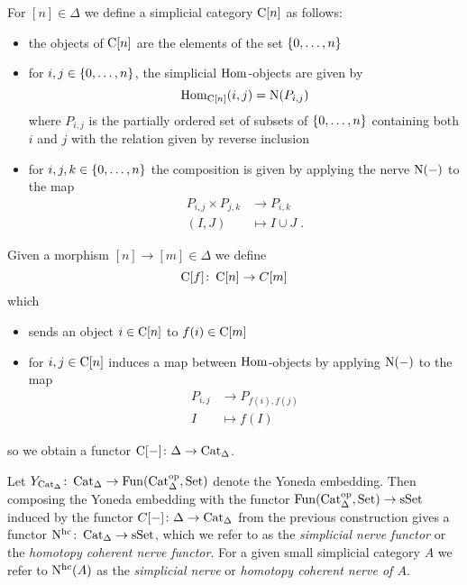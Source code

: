 \begin{construction}
    For $[n]\in\Delta$ we define a simplicial category $\operatorname{C}[n]$ as follows:
    \begin{itemize}
        \item the objects of $\operatorname{C}[n]$ are the elements of the set $\left\lbrace0,\ldots,n\right\rbrace$
        \item for $i,j\in\left\lbrace0,\ldots,n\right\rbrace$, the simplicial $\operatorname{Hom}$-objects are given by 
            \begin{equation*}
                \operatorname{Hom}_{\operatorname{C}[n]}(i,j)=\operatorname{N}(P_{i,j})
            \end{equation*}
            where $P_{i,j}$ is the partially ordered set of subsets of $\left\lbrace0,\ldots,n\right\rbrace$ containing both $i$ and $j$ with the relation given by reverse inclusion
        \item for $i,j,k\in\left\lbrace0,\ldots,n\right\rbrace$ the composition is given by applying the nerve $\operatorname{N}(-)$ to the map
        \begin{align*}
                P_{i,j}\times P_{j,k}&\to P_{i,k}\\
                (I,J)&\mapsto I\cup J\;.
        \end{align*}
    \end{itemize}
    Given a morphism $[n]\to[m]\in\Delta$ we define
    \begin{equation*}
        \operatorname{C}[f]\colon\operatorname{C}[n]\to C[m]
    \end{equation*}
    which
    \begin{itemize}
        \item sends an object $i\in\operatorname{C}[n]$ to $f(i)\in\operatorname{C}[m]$
        \item for $i,j\in\operatorname{C}[n]$ induces a map between $\operatorname{Hom}$-objects by applying $\operatorname{N}(-)$ to the map
            \begin{align*}
                P_{i,j}&\to P_{f(i),f(j)}\\
                I&\mapsto f(I)
            \end{align*}
    \end{itemize}
    so we obtain a functor $\operatorname{C}[-]\colon\Delta\to\operatorname{Cat}_{\Delta}$.
    \begin{reference}
        \cite[Notation 2.4.3.1]{kerodon}
    \end{reference}
\end{construction}
\begin{definition}
    Let $Y_{\operatorname{Cat}_{\Delta}}\colon\operatorname{Cat}_{\Delta}\to\operatorname{Fun}(\operatorname{Cat}_{\Delta}^{\operatorname{op}},\operatorname{Set})$ denote the Yoneda embedding.
    Then composing the Yoneda embedding with the functor $\operatorname{Fun}(\operatorname{Cat}_{\Delta}^{\operatorname{op}},\operatorname{Set})\to\operatorname{sSet}$ induced by the functor $C[-]\colon\Delta\to\operatorname{Cat}_{\Delta}$ from the previous construction gives a functor $\operatorname{N^{hc}}\colon\operatorname{Cat}_{\Delta}\to\operatorname{sSet}$, which we refer to as the \emph{simplicial nerve functor} or the \emph{homotopy coherent nerve functor}.
    For a given small simplicial category $A$ we refer to $\operatorname{N^{hc}}(A)$ as the \emph{simplicial nerve} or \emph{homotopy coherent nerve of $A$}.
\end{definition}
